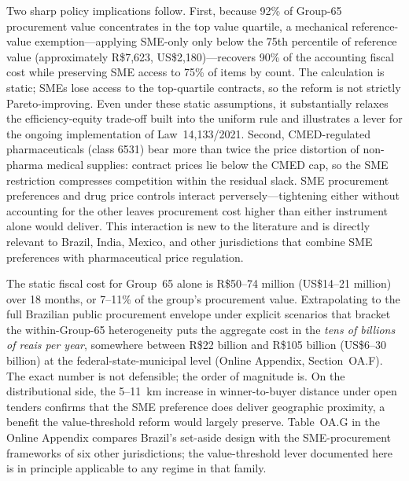 Two sharp policy implications follow. First, because 92\% of Group-65 procurement value concentrates in the top value quartile, a mechanical reference-value exemption---applying SME-only only below the 75th percentile of reference value (approximately R\$7{,}623, US\$2{,}180)---recovers 90\% of the accounting fiscal cost while preserving SME access to 75\% of items by count. The calculation is static; SMEs lose access to the top-quartile contracts, so the reform is not strictly Pareto-improving. Even under these static assumptions, it substantially relaxes the efficiency-equity trade-off built into the uniform rule and illustrates a lever for the ongoing implementation of Law~14{,}133/2021. Second, CMED-regulated pharmaceuticals (class 6531) bear more than twice the price distortion of non-pharma medical supplies: contract prices lie below the CMED cap, so the SME restriction compresses competition within the residual slack. SME procurement preferences and drug price controls interact perversely---tightening either without accounting for the other leaves procurement cost higher than either instrument alone would deliver. This interaction is new to the literature and is directly relevant to Brazil, India, Mexico, and other jurisdictions that combine SME preferences with pharmaceutical price regulation.

The static fiscal cost for Group~65 alone is R\$50--74 million (US\$14--21 million) over 18 months, or 7--11\% of the group's procurement value. Extrapolating to the full Brazilian public procurement envelope under explicit scenarios that bracket the within-Group-65 heterogeneity puts the aggregate cost in the \emph{tens of billions of reais per year}, somewhere between R\$22 billion and R\$105 billion (US\$6--30 billion) at the federal-state-municipal level (Online Appendix, Section~OA.F). The exact number is not defensible; the order of magnitude is. On the distributional side, the 5--11~km increase in winner-to-buyer distance under open tenders confirms that the SME preference does deliver geographic proximity, a benefit the value-threshold reform would largely preserve. Table~OA.G in the Online Appendix compares Brazil's set-aside design with the SME-procurement frameworks of six other jurisdictions; the value-threshold lever documented here is in principle applicable to any regime in that family.

